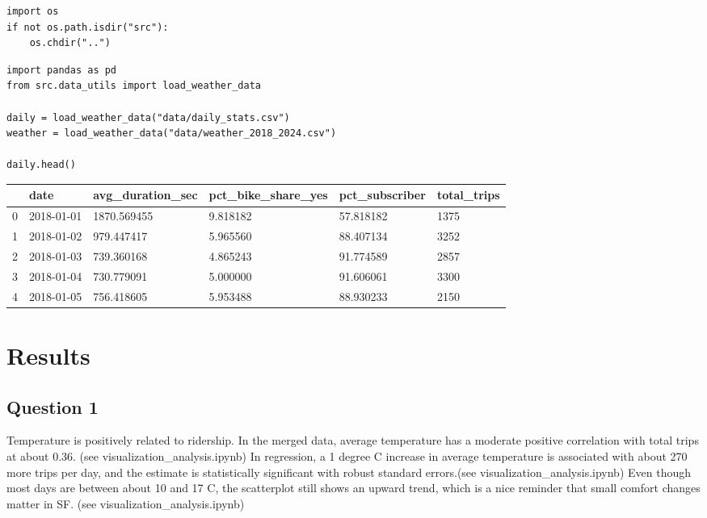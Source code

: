 \documentclass{article}
\begin{document}
\begin{verbatim}
import os
if not os.path.isdir("src"):
    os.chdir("..")
\end{verbatim}

\begin{verbatim}
import pandas as pd
from src.data_utils import load_weather_data

daily = load_weather_data("data/daily_stats.csv")
weather = load_weather_data("data/weather_2018_2024.csv")

daily.head()
\end{verbatim}

\bigskip\noindent
\begin{tabular}{p{}p{}p{}p{}p{}p{}}
\toprule
 & date & avg\_duration\_sec & pct\_bike\_share\_yes & pct\_subscriber & total\_trips \\
\hline
0 & 2018-01-01 & 1870.569455 & 9.818182 & 57.818182 & 1375 \\
\hline
1 & 2018-01-02 & 979.447417 & 5.965560 & 88.407134 & 3252 \\
\hline
2 & 2018-01-03 & 739.360168 & 4.865243 & 91.774589 & 2857 \\
\hline
3 & 2018-01-04 & 730.779091 & 5.000000 & 91.606061 & 3300 \\
\hline
4 & 2018-01-05 & 756.418605 & 5.953488 & 88.930233 & 2150 \\
\hline
\bottomrule
\end{tabular}

\bigskip

\section{Results}

\subsection{Question 1}

Temperature is positively related to ridership. In the merged data, average temperature has a moderate positive correlation with total trips at about 0.36. (see visualization\_analysis.ipynb)
In regression, a 1 degree C increase in average temperature is associated with about 270 more trips per day, and the estimate is statistically significant with robust standard errors.(see visualization\_analysis.ipynb)
Even though most days are between about 10 and 17 C, the scatterplot still shows an upward trend, which is a nice reminder that small comfort changes matter in SF. (see visualization\_analysis.ipynb)
\end{document}

